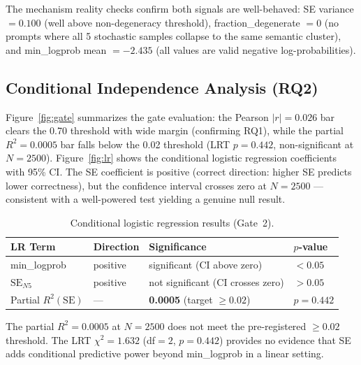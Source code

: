 The mechanism reality checks confirm both signals are well-behaved: SE variance $= 0.100$ (well above non-degeneracy threshold), fraction\_degenerate $= 0$ (no prompts where all 5 stochastic samples collapse to the same semantic cluster), and min\_logprob mean $= -2.435$ (all values are valid negative log-probabilities).

\subsection{Conditional Independence Analysis (RQ2)}

Figure~\ref{fig:gate} summarizes the gate evaluation: the Pearson $|r|=0.026$ bar clears the 0.70 threshold with wide margin (confirming RQ1), while the partial $R^2=0.0005$ bar falls below the 0.02 threshold (LRT $p=0.442$, non-significant at $N=2500$). Figure~\ref{fig:lr} shows the conditional logistic regression coefficients with 95\% CI. The SE coefficient is positive (correct direction: higher SE predicts lower correctness), but the confidence interval crosses zero at $N=2500$ --- consistent with a well-powered test yielding a genuine null result.

\begin{table}[h]
\centering
\caption{Conditional logistic regression results (Gate~2).}
\label{tab:gate2}
\begin{tabular}{llll}
\toprule
\textbf{LR Term} & \textbf{Direction} & \textbf{Significance} & \textbf{$p$-value} \\
\midrule
min\_logprob & positive & significant (CI above zero) & $< 0.05$ \\
$\text{SE}_{N5}$ & positive & not significant (CI crosses zero) & $> 0.05$ \\
Partial $R^2(\text{SE})$ & --- & \textbf{0.0005} (target $\geq 0.02$) & $p=0.442$ \\
\bottomrule
\end{tabular}
\end{table}

The partial $R^2 = 0.0005$ at $N=2500$ does not meet the pre-registered $\geq 0.02$ threshold. The LRT $\chi^2=1.632$ (df$=2$, $p=0.442$) provides no evidence that SE adds conditional predictive power beyond min\_logprob in a linear setting.

